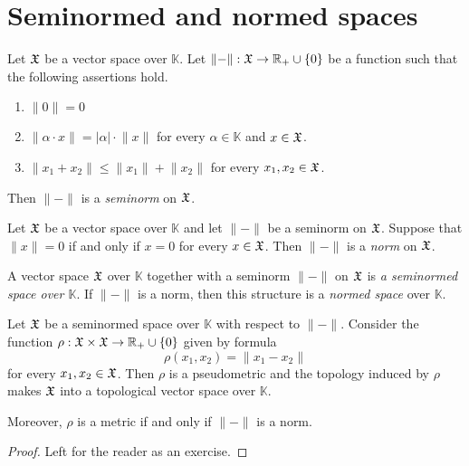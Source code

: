\documentclass[10pt]{amsart}
\begin{document}
\section{Seminormed and normed spaces}

\begin{definition}
	Let ${\mathfrak X}$ be a vector space over $\mathbb{K}$. Let $\lVert-\rVert:{\mathfrak X} \rightarrow {\mathbb R}_+ \cup \{0\}$ be a function such that the following assertions hold.
	\begin{enumerate}[label=\textbf{(\arabic*)}, leftmargin=*]
		\item $\lVert 0 \rVert = 0$
		\item $\lVert \alpha \cdot x\rVert = |\alpha|\cdot \lVert x\rVert$ for every $\alpha \in \mathbb{K}$ and $x \in {\mathfrak X}$.
		\item $\lVert x_1 + x_2 \rVert \leq \lVert x_1 \rVert + \lVert x_2 \rVert$ for every $x_1,x_2 \in {\mathfrak X}$.
	\end{enumerate}
	Then $\lVert-\rVert$ is a \textit{seminorm} on ${\mathfrak X}$.
\end{definition}

\begin{definition}
	Let ${\mathfrak X}$ be a vector space over $\mathbb{K}$ and let $\lVert - \rVert$ be a seminorm on ${\mathfrak X}$. Suppose that $\lVert x \rVert = 0$ if and only if $x = 0$ for every $x \in {\mathfrak X}$. Then $\lVert - \rVert$ is a \textit{norm} on ${\mathfrak X}$.
\end{definition}

\begin{definition}
	A vector space ${\mathfrak X}$ over $\mathbb{K}$ together with a seminorm $\lVert - \rVert$ on ${\mathfrak X}$ is \textit{a seminormed space over $\mathbb{K}$}. If $\lVert - \rVert$ is a norm, then this structure is a \textit{normed space} over $\mathbb{K}$.
\end{definition}

\begin{fact}\label{fact:topology_induced_by_seminorm}
	Let ${\mathfrak X}$ be a seminormed space over $\mathbb{K}$ with respect to $\lVert - \rVert$. Consider the function $\rho:{\mathfrak X}\times {\mathfrak X} \rightarrow {\mathbb R}_+\cup \{0\}$ given by formula
	$$\rho(x_1,x_2) = \lVert x_1 - x_2 \rVert$$
	for every $x_1, x_2\in {\mathfrak X}$. Then $\rho$ is a pseudometric and the topology induced by $\rho$ makes ${\mathfrak X}$ into a topological vector space over $\mathbb{K}$.

	Moreover, $\rho$ is a metric if and only if $\lVert-\rVert$ is a norm.
\end{fact}
\begin{proof}
	Left for the reader as an exercise.
\end{proof}
\end{document}
